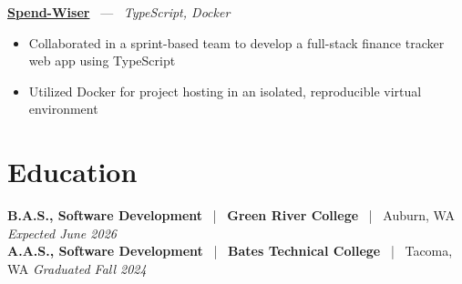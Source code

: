 \documentclass[10pt, letterpaper]{article}
\newcommand{\jobhead}[4]{%
  \vspace{5pt}%
  {\bfseries\color{dark}#1}%
  ~{\color{light}|}~%
  {\bfseries\color{navy}#2}%
  ~{\color{light}|}~%
  {\color{light}#3}%
  \hfill{\color{light}\small\textit{#4}}\\[-2pt]%
}
\newcommand{\projhead}[3]{%
  \vspace{5pt}%
  {\bfseries\color{dark}\href{#2}{#1}}%
  ~{\color{light}---}~%
  {\color{light}\small\textit{#3}}\\[-2pt]%
}
\begin{document}
\projhead{Spend-Wiser}{https://github.com/JesseChum/w26-sdev372-spendwiser-finance-tracker}{TypeScript, Docker}
\begin{itemize}
  \item Collaborated in a sprint-based team to develop a full-stack finance tracker web app using TypeScript
  \item Utilized Docker for project hosting in an isolated, reproducible virtual environment
\end{itemize}

\section{Education}

\jobhead{B.A.S., Software Development}{Green River College}{Auburn, WA}{Expected June 2026}
\jobhead{A.A.S., Software Development}{Bates Technical College}{Tacoma, WA}{Graduated Fall 2024}
\end{document}
